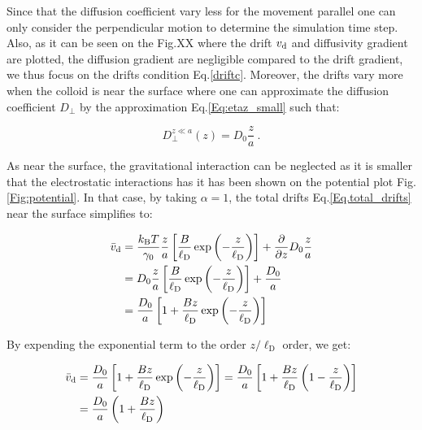 Since that the diffusion coefficient vary less for the movement parallel one can only consider the perpendicular motion to determine the simulation time step. Also, as it can be seen on the Fig.XX where the drift $v_\textnormal{d}$ and diffusivity gradient are plotted, the diffusion gradient are negligible compared to the drift gradient, we thus focus on the drifts condition Eq.\ref{driftc}. Moreover, the drifts vary more when the colloid is near the surface where one can approximate the diffusion coefficient $D_\bot$ by the approximation Eq.\ref{Eq:etaz_small} such that:

\begin{equation}
	D_\bot ^{z\ll a} (z) = D_ 0 \frac{z}{a} ~.
\end{equation}

As near the surface, the gravitational interaction can be neglected as it is smaller that the electrostatic interactions has it has been shown on the potential plot Fig.\ref{Fig:potential}. In that case, by taking $\alpha = 1$, the total drifts Eq.\ref{Eq.total_drifts} near the surface simplifies to:

\begin{equation}
	\begin{aligned}
		\bar{v}_\textnormal{d} &=  \frac{k_\mathrm{B}T}{\gamma_0} \frac{z}{a} \left[\frac{B}{\ell_\mathrm{D}} \exp \left(-\frac{z}{\ell_\mathrm{D}}\right)\right] + \frac{\partial}{\partial z} D_0 \frac{z}{a} \\
		&= D_0 \frac{z}{a} \left[\frac{B}{\ell_\mathrm{D}} \exp \left(-\frac{z}{\ell_\mathrm{D}}\right)\right] + \frac{D_0}{a} \\
		&= \frac{D_0}{a} \left[ 1 + \frac{Bz}{\ell_\mathrm{D}} \exp \left(-\frac{z}{\ell_\mathrm{D}}\right)\right]
	\end{aligned}
\end{equation}

By expending the exponential term to the order $z/\ell_\mathrm{D}$ order, we get:

\begin{equation}
	\begin{aligned}
		\bar{v}_\textnormal{d} &= \frac{D_0}{a} \left[ 1 + \frac{Bz}{\ell_\mathrm{D}} \exp \left(-\frac{z}{\ell_\mathrm{D}}\right)\right]
		 =  \frac{D_0}{a} \left[ 1 + \frac{Bz}{\ell_\mathrm{D}}  \left(1 -\frac{z}{\ell_\mathrm{D}}\right)\right] \\
		& = \frac{D_0}{a} \left( 1 + \frac{B z}{\ell_\mathrm{D}}\right)
	\end{aligned}
	\label{drifts_short}
\end{equation}

